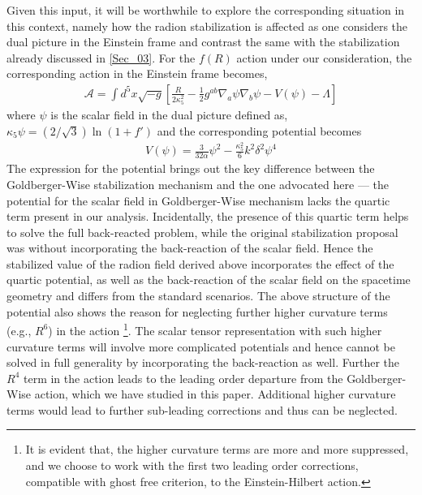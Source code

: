 \documentclass{article}
\def\EH{Einstein-Hilbert }
\begin{document}
Given this input, it will be worthwhile to explore the corresponding situation in this context, namely how the radion stabilization is affected as one considers the dual picture in the Einstein frame and contrast the same with the stabilization already discussed in \ref{Sec_03}. For the $f(R)$ action under our consideration, the corresponding action in the Einstein frame becomes,
\begin{align}
\mathcal{A}=\int d^{5}x\sqrt{-g}\left[\frac{R}{2\kappa _{5}^{2}}-\frac{1}{2}g^{ab}\nabla _{a}\psi \nabla _{b}\psi -V(\psi)-\Lambda \right]
\label{ST_01}
\end{align}
where $\psi$ is the scalar field in the dual picture defined as, $\kappa _{5}\psi=(2/\sqrt{3})\ln (1+f')$ and the corresponding potential becomes
\begin{align}
V(\psi)=\frac{3}{32\alpha}\psi ^{2}-\frac{\kappa _{5}^{2}}{6}k^{2}\delta ^{2}\psi ^{4}
\end{align}
The expression for the potential brings out the key difference between the Goldberger-Wise stabilization mechanism and the one advocated here --- the potential for the scalar field in Goldberger-Wise mechanism lacks the quartic term present in our analysis. Incidentally, the presence of this quartic term helps to solve the full back-reacted problem, while the original stabilization proposal was without incorporating the back-reaction of the scalar field. Hence the stabilized value of the radion field derived above incorporates the effect of the quartic potential, as well as the back-reaction of the scalar field on the spacetime geometry and differs from the standard scenarios. The above structure of the potential also shows the reason for neglecting further higher curvature terms (e.g., $R^{6}$) in the action \footnote{It is evident that, the higher curvature terms are more and more suppressed, and we choose to work with the first two leading order corrections, compatible with ghost free criterion, to the \EH 
action.}. The scalar tensor representation with such higher curvature terms will involve more complicated potentials and hence cannot be solved in full generality by incorporating the back-reaction as well. Further the $R^{4}$ term in the action leads to the leading order departure from the Goldberger-Wise action, which we have studied in this paper. Additional higher curvature terms would lead to further sub-leading corrections and thus can be neglected.
\end{document}
